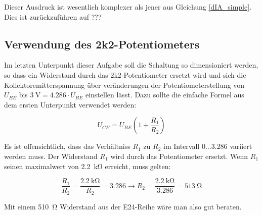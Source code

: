 Dieser Ausdruck ist wesentlich komplexer als jener aus Gleichung \ref{dIA_simple}. Dies ist zurückzuführen auf ???

\subsection{Verwendung des 2k2-Potentiometers}

Im letzten Unterpunkt dieser Aufgabe soll die Schaltung so dimensioniert werden, so dass ein Widerstand durch das 2k2-Potentiometer ersetzt wird und sich die Kollektoremitterspannung über veränderungen der Potentiometerstellung von $U_{BE}$ bis $\SI{3}{\volt}=4.286 \cdot U_{BE}$ einstellen lässt. Dazu sollte die einfache Formel aus dem ersten Unterpunkt verwendet werden:

\begin{equation*}
     U_{CE} = U_{BE} \left( 1 + \frac{R_1}{R_2} \right)
\end{equation*}

Es ist offensichtlich, dass das Verhältniss $R_1$ zu $R_2$ im Intervall $0 \ldots 3.286$ variiert werden muss. Der Widerstand $R_1$ wird durch das Potentiometer ersetzt. Wenn $R_1$ seinen maximalwert von \SI{2.2}{\kilo \ohm} erreicht, muss gelten:

\begin{equation*}
    \frac{R_1}{R_2} = \frac{\SI{2.2}{\kilo \ohm}}{R_2} = 3.286 \rightarrow R_2 = \frac{\SI{2.2}{\kilo \ohm}}{3.286} = \SI{513}{\ohm}
\end{equation*}

Mit einem \SI{510}{\ohm} Widerstand aus der E24-Reihe wäre man also gut beraten.